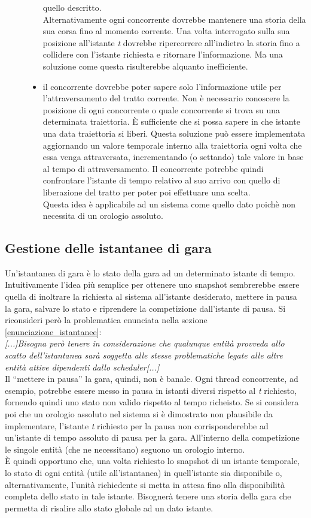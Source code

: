 \begin{description}
\begin{itemize}
quello descritto.\\
Alternativamente ogni concorrente dovrebbe mantenere una storia della sua corsa fino al momento corrente. Una volta interrogato
sulla sua posizione all'istante \emph{t} dovrebbe ripercorrere all'indietro la storia fino a collidere con l'istante richiesta
e ritornare l'informazione. Ma una soluzione come questa risulterebbe alquanto inefficiente.
\item il concorrente dovrebbe poter sapere solo l'informazione utile per l'attraversamento del tratto corrente. Non è necessario
conoscere la posizione di ogni concorrente o quale concorrente si trova su una determinata traiettoria. \`{E} sufficiente che
si possa sapere in che istante una data traiettoria si liberi. Questa soluzione può essere implementata aggiornando un valore
temporale interno alla traiettoria ogni volta che essa venga attraversata, incrementando (o settando) tale valore in base al 
tempo di attraversamento. Il concorrente potrebbe quindi confrontare l'istante di tempo relativo
al suo arrivo con quello di liberazione del tratto per poter poi effettuare una scelta.\\
Questa idea è applicabile ad un sistema come quello dato poichè non necessita di un orologio assoluto.
\end{itemize}
\end{description}
\subsection{Gestione delle istantanee di gara}
\label{analisi_istantanee}
Un'istantanea di gara è lo stato della gara ad un determinato istante di tempo. Intuitivamente l'idea più semplice per ottenere
uno snapshot sembrerebbe essere quella di inoltrare la richiesta al sistema all'istante desiderato, mettere in pausa la gara, 
salvare lo stato e riprendere la competizione dall'istante di pausa. Si riconsideri però la problematica enunciata nella
sezione \ref{enunciazione_istantanee}:\\
\emph{[...]Bisogna però tenere in considerazione che qualunque entità provveda allo scatto
dell'istantanea sarà soggetta alle stesse problematiche legate alle altre entità attive dipendenti dallo scheduler[...]}\\
Il ``mettere in pausa'' la gara, quindi, non è banale. Ogni thread concorrente, ad esempio, potrebbe essere messo in pausa
in istanti diversi rispetto al \emph{t} richiesto, fornendo quindi uno stato non valido rispetto al tempo richeisto. 
Se si considera poi che un orologio assoluto nel sistema si è dimostrato non plausibile da implementare, l'istante \emph{t} richiesto 
per la pausa non corrisponderebbe ad un'istante
di tempo assoluto di pausa per la gara. All'interno della competizione le singole entità (che ne necessitano) seguono un orologio interno.\\
\`{E} quindi opportuno che, una volta richiesto lo snapshot di un istante temporale, lo stato di ogni entità (utile all'istantanea) in 
quell'istante sia disponibile o, alternativamente, l'unità richiedente si metta in attesa fino alla disponibilità completa dello stato
in tale istante. Bisognerà tenere una storia della gara che permetta di risalire allo stato globale ad un dato istante.
